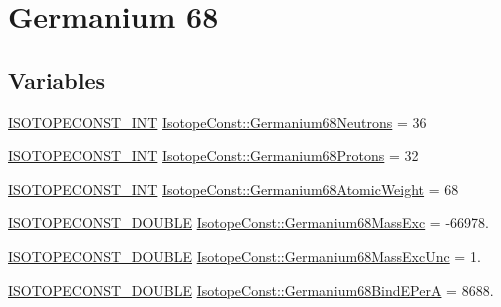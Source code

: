 \hypertarget{group___isotope_const-_germanium-_ge68}{}\section{Germanium 68}
\label{group___isotope_const-_germanium-_ge68}
\subsection*{Variables}
\begin{DoxyCompactItemize}
\item 
\mbox{\hyperlink{group___isotope_const-_macros_ga5f18360b3e99483a35c32d789e62621c}{I\+S\+O\+T\+O\+P\+E\+C\+O\+N\+S\+T\+\_\+\+I\+NT}} \mbox{\hyperlink{group___isotope_const-_germanium-_ge68_ga19f78e45483c1b572173e0bebcb7afec}{Isotope\+Const\+::\+Germanium68\+Neutrons}} = 36
\item 
\mbox{\hyperlink{group___isotope_const-_macros_ga5f18360b3e99483a35c32d789e62621c}{I\+S\+O\+T\+O\+P\+E\+C\+O\+N\+S\+T\+\_\+\+I\+NT}} \mbox{\hyperlink{group___isotope_const-_germanium-_ge68_ga4a29e3ae32e1e43b3c8cade729d12810}{Isotope\+Const\+::\+Germanium68\+Protons}} = 32
\item 
\mbox{\hyperlink{group___isotope_const-_macros_ga5f18360b3e99483a35c32d789e62621c}{I\+S\+O\+T\+O\+P\+E\+C\+O\+N\+S\+T\+\_\+\+I\+NT}} \mbox{\hyperlink{group___isotope_const-_germanium-_ge68_gae15d68c84e4606d5eaad7372abbc3912}{Isotope\+Const\+::\+Germanium68\+Atomic\+Weight}} = 68
\item 
\mbox{\hyperlink{group___isotope_const-_macros_ga8f45a7272ce02c0b4c65c44636ed719a}{I\+S\+O\+T\+O\+P\+E\+C\+O\+N\+S\+T\+\_\+\+D\+O\+U\+B\+LE}} \mbox{\hyperlink{group___isotope_const-_germanium-_ge68_gaa4a026eab67fe49c35955227b09d12d5}{Isotope\+Const\+::\+Germanium68\+Mass\+Exc}} = -\/66978.
\item 
\mbox{\hyperlink{group___isotope_const-_macros_ga8f45a7272ce02c0b4c65c44636ed719a}{I\+S\+O\+T\+O\+P\+E\+C\+O\+N\+S\+T\+\_\+\+D\+O\+U\+B\+LE}} \mbox{\hyperlink{group___isotope_const-_germanium-_ge68_gaf1e0aa78534117069d43817e8882bc90}{Isotope\+Const\+::\+Germanium68\+Mass\+Exc\+Unc}} = 1.
\item 
\mbox{\hyperlink{group___isotope_const-_macros_ga8f45a7272ce02c0b4c65c44636ed719a}{I\+S\+O\+T\+O\+P\+E\+C\+O\+N\+S\+T\+\_\+\+D\+O\+U\+B\+LE}} \mbox{\hyperlink{group___isotope_const-_germanium-_ge68_ga4eb167b2aa1c078ab84e8da885732908}{Isotope\+Const\+::\+Germanium68\+Bind\+E\+PerA}} = 8688.
\item 

\end{DoxyCompactItemize}

